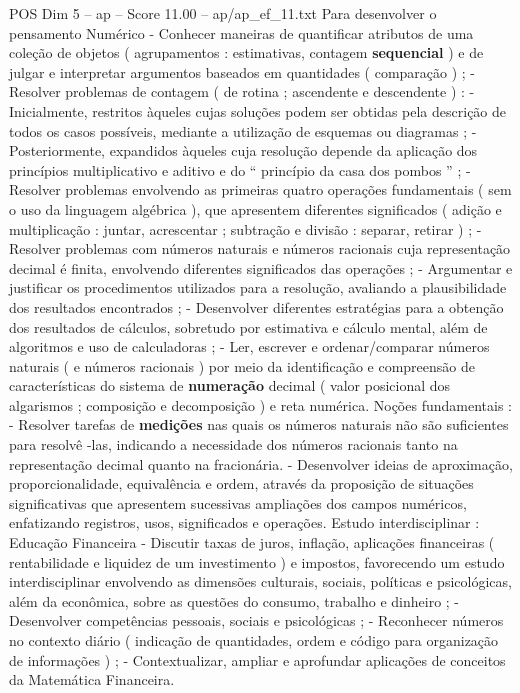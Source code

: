 \begin{textsample}{POS Dim 5 – ap – Score 11.00 – ap/ap\_ef\_11.txt}
Para desenvolver o pensamento Numérico - Conhecer maneiras de quantificar atributos de uma coleção de objetos ( agrupamentos : estimativas, contagem \textbf{sequencial} ) e de julgar e interpretar argumentos baseados em quantidades ( comparação ) ; - Resolver problemas de contagem ( de rotina ; ascendente e descendente ) : - Inicialmente, restritos àqueles cujas soluções podem ser obtidas pela descrição de todos os casos possíveis, mediante a utilização de esquemas ou diagramas ; - Posteriormente, expandidos àqueles cuja resolução depende da aplicação dos princípios multiplicativo e aditivo e do “ princípio da casa dos pombos ” ; - Resolver problemas envolvendo as primeiras quatro operações fundamentais ( sem o uso da linguagem algébrica ), que apresentem diferentes significados ( adição e multiplicação : juntar, acrescentar ; subtração e divisão : separar, retirar ) ; - Resolver problemas com números naturais e números racionais cuja representação decimal é finita, envolvendo diferentes significados das operações ; - Argumentar e justificar os procedimentos utilizados para a resolução, avaliando a plausibilidade dos resultados encontrados ; - Desenvolver diferentes estratégias para a obtenção dos resultados de cálculos, sobretudo por estimativa e cálculo mental, além de algoritmos e uso de calculadoras ; - Ler, escrever e ordenar/comparar números naturais ( e números racionais ) por meio da identificação e compreensão de características do sistema de \textbf{numeração} decimal ( valor posicional dos algarismos ; composição e decomposição ) e reta numérica.
Noções fundamentais : - Resolver tarefas de \textbf{medições} nas quais os números naturais não são suficientes para resolvê -las, indicando a necessidade dos números racionais tanto na representação decimal quanto na fracionária. - Desenvolver ideias de aproximação, proporcionalidade, equivalência e ordem, através da proposição de situações significativas que apresentem sucessivas ampliações dos campos numéricos, enfatizando registros, usos, significados e operações.
Estudo interdisciplinar : Educação Financeira - Discutir taxas de juros, inflação, aplicações financeiras ( rentabilidade e liquidez de um investimento ) e impostos, favorecendo um estudo interdisciplinar envolvendo as dimensões culturais, sociais, políticas e psicológicas, além da econômica, sobre as questões do consumo, trabalho e dinheiro ; - Desenvolver competências pessoais, sociais e psicológicas ; - Reconhecer números no contexto diário ( indicação de quantidades, ordem e código para organização de informações ) ; - Contextualizar, ampliar e aprofundar aplicações de conceitos da Matemática Financeira.

\end{textsample}
